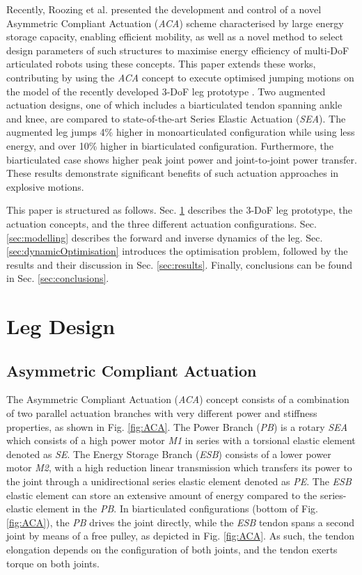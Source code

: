 \documentclass[letterpaper, 10 pt, conference]{ieeeconf}  %
\begin{document}
Recently, Roozing et al. \cite{roozing2016development, roozing2016design, roozing_design_2018} presented the development and control of a novel Asymmetric Compliant Actuation (\textit{ACA}) scheme characterised by large energy storage capacity, enabling efficient mobility, as well as a novel method to select design parameters of such structures to maximise energy efficiency of multi-DoF articulated robots using these concepts. This paper extends these works, contributing by using the \textit{ACA} concept to execute optimised jumping motions on the model of the recently developed 3-DoF leg prototype \cite{roozing_design_2018}. Two augmented actuation designs, one of which includes a biarticulated tendon spanning ankle and knee, are compared to state-of-the-art Series Elastic Actuation (\textit{SEA}). The augmented leg jumps 4\% higher in monoarticulated configuration while using less energy, and over 10\% higher in biarticulated configuration. Furthermore, the biarticulated case shows higher peak joint power and joint-to-joint power transfer. These results demonstrate significant benefits of such actuation approaches in explosive motions.

This paper is structured as follows. Sec. \ref{sec:legDesign} describes the 3-DoF leg prototype, the actuation concepts, and the three different actuation configurations. Sec. \ref{sec:modelling} describes the forward and inverse dynamics of the leg. Sec. \ref{sec:dynamicOptimisation} introduces the optimisation problem, followed by the results and their discussion in Sec. \ref{sec:results}. Finally, conclusions can be found in Sec. \ref{sec:conclusions}.


\section{Leg Design}
\label{sec:legDesign}

\subsection{Asymmetric Compliant Actuation}
\label{subsec:ACA}
The Asymmetric Compliant Actuation (\textit{ACA}) concept consists of a combination of two parallel actuation branches with very different power and stiffness properties, as shown in Fig. \ref{fig:ACA}. The Power Branch (\textit{PB}) is a rotary \textit{SEA} which consists of a high power motor \textit{M1} in series with a torsional elastic element denoted as \textit{SE}. The Energy Storage Branch (\textit{ESB}) consists of a lower power motor \textit{M2}, with a high reduction linear transmission which transfers its power to the joint through a unidirectional series elastic element denoted as \textit{PE}. The \textit{ESB} elastic element can store an extensive amount of energy compared to the series-elastic element in the \textit{PB}.
 In biarticulated configurations (bottom of Fig. \ref{fig:ACA}), the \textit{PB} drives the joint directly, while the \textit{ESB} tendon spans a second joint by means of a free pulley, as depicted in Fig. \ref{fig:ACA}. As such, the tendon elongation depends on the configuration of both joints, and the tendon exerts torque on both joints.
\end{document}

